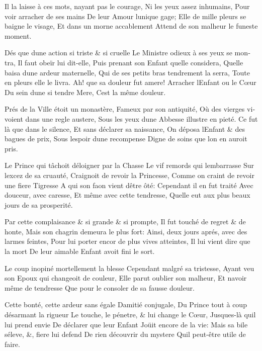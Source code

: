 \documentclass[14pt,a4paper]{memoir}
\begin{document}
{{\begin{otherlanguage}{french}
{Il la laisse à ces mots, n\textquotesingle ayant pas le courage, } {Ni
les yeux assez inhumains,} {Pour voir arracher de ses mains} {De leur
Amour l\textquotesingle unique gage;} {Elle de mille pleurs se baigne le
visage,} {Et dans un morne accablement} {Attend de son malheur le
funeste moment.}

{Dés que d\textquotesingle une action si triste \& si cruelle } {Le
Ministre odieux à ses yeux se montra,} {Il faut obeïr lui dit-elle,}
{Puis prenant son Enfant qu\textquotesingle elle considera,}
{Qu\textquotesingle elle baisa d\textquotesingle une ardeur maternelle,}
{Qui de ses petits bras tendrement la serra,} {Toute en pleurs elle le
livra.} {Ah! que sa douleur fut amere!} {Arracher
l\textquotesingle Enfant ou le Cœur} {Du sein d\textquotesingle une si
tendre Mere,} {C\textquotesingle est la même douleur.}

{Prés de la Ville étoit un monastère,} {Fameux par son antiquité,} {Où
des vierges vivoient dans une regle austere, } {Sous les yeux
d\textquotesingle une Abbesse illustre en pieté.} {Ce fut là que dans le
silence,} {Et sans déclarer sa naissance,} {On déposa
l\textquotesingle Enfant \& des bagues de prix,} {Sous
l\textquotesingle espoir d\textquotesingle une recompense} {Digne de
soins que l\textquotesingle on en auroit pris.}

{Le Prince qui tâchoit d\textquotesingle éloigner par la Chasse} {Le vif
remords qui l\textquotesingle embarrasse} {Sur l\textquotesingle excez
de sa cruauté,} {Craignoit de revoir la Princesse,} {Comme on craint de
revoir une fiere Tigresse} {A qui son faon vient d\textquotesingle être
ôté:} {Cependant il en fut traité} {Avec douceur, avec caresse,} {Et
même avec cette tendresse,} {Qu\textquotesingle elle eut aux plus beaux
jours de sa prosperité.}

{Par cette complaisance \& si grande \& si prompte,} {Il fut touché de
regret \& de honte,} {Mais son chagrin demeura le plus fort:} {Ainsi,
deux jours aprés, avec des larmes feintes, } {Pour lui porter encor de
plus vives atteintes,} {Il lui vient dire que la mort} {De leur aimable
Enfant avoit fini le sort.}

{Le coup inopiné mortellement la blesse} {Cependant malgré sa
tristesse,} {Ayant veu son Epoux qui changeoit de couleur,} {Elle parut
oublier son malheur,} {Et n\textquotesingle avoir même de tendresse}
{Que pour le consoler de sa fausse douleur.}

{Cette bonté, cette ardeur sans égale} {D\textquotesingle amitié
conjugale,} {Du Prince tout à coup désarmant la rigueur} {Le touche, le
pénetre, \& lui change le Cœur,} {Jusques-là qu\textquotesingle il lui
prend envie} {De déclarer que leur Enfant} {Joüit encore de la vie:}
{Mais sa bile s\textquotesingle éleve, \&, fiere lui defend} {De rien
découvrir du mystere} {Qu\textquotesingle il peut-être utile de faire.}


\end{otherlanguage}}}
\end{document}
